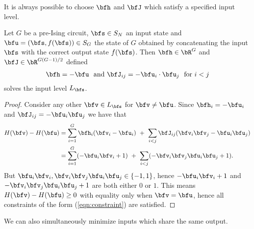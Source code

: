 \documentclass[raggedright, nofonts, notitlepage, openany, debug]{tufte-book}
\begin{document}
It is always possible to choose $\bfh$ and $\bfJ$ which satisfy a specified input level.
\begin{prop}\label{prop:pvec_solves_input_level}
  Let $G$ be a pre-Ising circuit, $\bfs \in S_N$ an input state and $\bfu = (\bfs,f(\bfs)) \in S_G$ the state of $G$ obtained by concatenating the input $\bfs$ with the correct output state $f(\bfs)$. Then $\bfh \in \bR^G$ and $\bfJ \in \bR^{G(G-1)/2}$ defined
  \begin{align*}
    \bfh = - \bfu ~\text{ and } \bfJ_{ij} = -\bfu_i\cdot \bfu_j ~\text{ for } i < j
  \end{align*}
  solves the input level $L_\bfs$.
\end{prop}
\begin{proof}
  Consider any other $\bfv \in L_\bfs$ for $\bfv \neq \bfu$. Since $\bfh_i = -\bfu_i$ and $\bfJ_{ij} = -\bfu_i\bfu_j$ we have that
  \begin{align*}
    H(\bfv) - H(\bfu) 
      &= \sum_{i=1}^G \bfh_i(\bfv_i - \bfu_i) ~+~ \sum_{i < j} \bfJ_{ij}(\bfv_i\bfv_j - \bfu_i\bfu_j) \\
      &= \sum_{i=1}^G (-\bfu_i\bfv_i + 1) ~+~ \sum_{i < j} (-\bfv_i\bfv_j\bfu_i\bfu_j + 1).
  \end{align*}
  But $\bfu_i\bfv_i, \bfv_i\bfv_j\bfu_i\bfu_j \in \{-1,1\}$, hence $-\bfu_i\bfv_i + 1$ and $-\bfv_i\bfv_j\bfu_i\bfu_j + 1$ are both either $0$ or $1$. This means $H(\bfv) - H(\bfu)\geq 0$ with equality only when $\bfv = \bfu$, hence all constraints of the form (\ref{eqn:constraint}) are satisfied.
\end{proof}
We can also simultaneously minimize inputs which share the same output.
\end{document}
